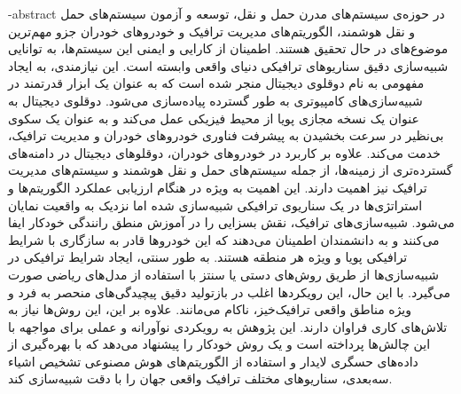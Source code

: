 
\department{}

\fa-abstract{
    در حوزه‌ی سیستم‌های مدرن حمل و نقل، توسعه و آزمون سیستم‌های حمل و نقل هوشمند، الگوریتم‌های مدیریت ترافیک و خودرو‌های خودران جزو مهم‌ترین موضوع‌های در حال تحقیق هستند. اطمینان از کارایی و ایمنی این سیستم‌ها، به توانایی شبیه‌سازی دقیق سناریو‌های ترافیکی دنیای واقعی وابسته است. این نیازمندی، به ایجاد مفهومی به نام دوقلوی دیجیتال منجر شده است که به عنوان یک ابزار قدرتمند در شبیه‌سازی‌های کامپیوتری به طور گسترده پیاده‌سازی می‌شود. دوقلوی دیجیتال به عنوان یک نسخه مجازی پویا از محیط فیزیکی عمل می‌کند و به عنوان یک سکوی بی‌نظیر در سرعت بخشیدن به پیشرفت فناوری خودرو‌های خودران و مدیریت ترافیک، خدمت می‌کند. علاوه بر کاربرد در خودروهای خودران، دوقلوهای دیجیتال در دامنه‌های گسترده‌تری از زمینه‌ها، از جمله سیستم‌های حمل‌ و نقل هوشمند و سیستم‌های مدیریت ترافیک نیز اهمیت دارند. این اهمیت به ویژه در هنگام ارزیابی عملکرد الگوریتم‌ها و استراتژی‌ها در یک سناریوی ترافیکی شبیه‌سازی شده اما نزدیک به واقعیت نمایان می‌شود. شبیه‌سازی‌های ترافیک، نقش بسزایی را در آموزش منطق رانندگی خودکار ایفا می‌کنند و به دانشمندان اطمینان می‌دهند که این خودروها قادر به سازگاری با شرایط ترافیکی پویا و ویژه هر منطقه هستند. به طور سنتی، ایجاد شرایط ترافیکی در شبیه‌سازی‌ها از طریق روش‌های دستی یا سنتز با استفاده از مدل‌های ریاضی صورت می‌گیرد. با این حال، این رویکردها اغلب در بازتولید دقیق پیچیدگی‌های منحصر به فرد و ویژه مناطق واقعی ترافیک‌خیز، ناکام می‌مانند. علاوه بر این، این روش‌ها نیاز به تلاش‌های کاری فراوان دارند.‌‌ این پژوهش به رویکردی نوآورانه و عملی برای مواجهه با این چالش‌ها پرداخته است و یک روش خودکار را پیشنهاد می‌دهد که با بهره‌گیری از داده‌های حسگری لایدار و استفاده از الگوریتم‌های هوش مصنوعی تشخیص اشیاء سه‌بعدی، سناریو‌های مختلف ترافیک واقعی جهان را با دقت شبیه‌سازی کند.
}

